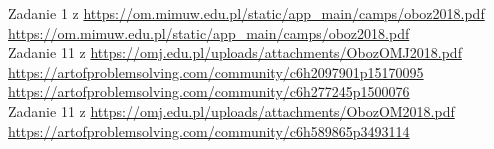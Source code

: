 
 Zadanie 1 z \url{https://om.mimuw.edu.pl/static/app_main/camps/oboz2018.pdf }\\
 \url{https://om.mimuw.edu.pl/static/app_main/camps/oboz2018.pdf }\\
 Zadanie 11 z \url{https://omj.edu.pl/uploads/attachments/ObozOMJ2018.pdf}\\
 \url{https://artofproblemsolving.com/community/c6h2097901p15170095}\\
 \url{
https://artofproblemsolving.com/community/c6h277245p1500076}\\
 Zadanie 11 z \url{
https://omj.edu.pl/uploads/attachments/ObozOM2018.pdf}\\
 \url{https://artofproblemsolving.com/community/c6h589865p3493114}\\
